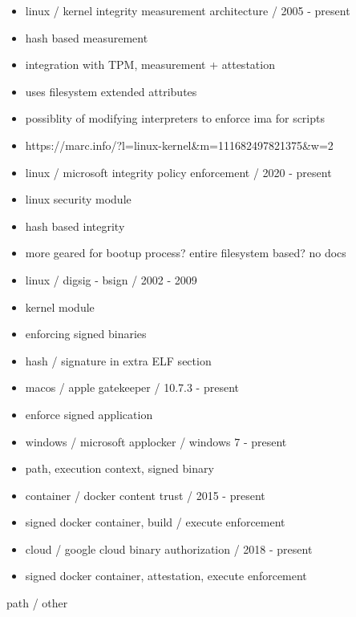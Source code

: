 \documentclass[]{article}
\providecommand{\tightlist}{%
  \setlength{\itemsep}{0pt}\setlength{\parskip}{0pt}}
\begin{document}
\begin{itemize}
\tightlist
\item
  linux / kernel integrity measurement architecture / 2005 - present
\item
  hash based measurement
\item
  integration with TPM, measurement + attestation
\item
  uses filesystem extended attributes
\item
  possiblity of modifying interpreters to enforce ima for scripts
\item
  https://marc.info/?l=linux-kernel\&m=111682497821375\&w=2
\item
  linux / microsoft integrity policy enforcement / 2020 - present
\item
  linux security module
\item
  hash based integrity
\item
  more geared for bootup process? entire filesystem based? no docs
\item
  linux / digsig - bsign / 2002 - 2009
\item
  kernel module
\item
  enforcing signed binaries
\item
  hash / signature in extra ELF section
\item
  macos / apple gatekeeper / 10.7.3 - present
\item
  enforce signed application
\item
  windows / microsoft applocker / windows 7 - present
\item
  path, execution context, signed binary
\item
  container / docker content trust / 2015 - present
\item
  signed docker container, build / execute enforcement
\item
  cloud / google cloud binary authorization / 2018 - present
\item
  signed docker container, attestation, execute enforcement
\end{itemize}

path / other
\end{document}
